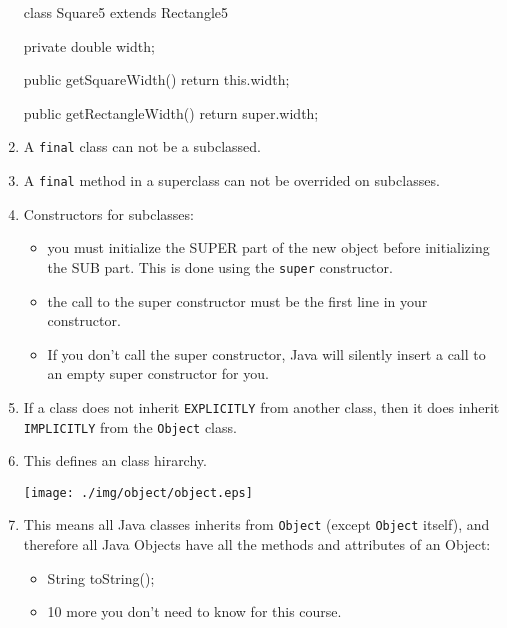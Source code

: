 \documentclass[a4paper, 9pt]{extarticle}
\begin{document}
\begin{enumerate}
\begin{blackboard}
class Square5 extends Rectangle5 {
  private double width;

  public getSquareWidth() {
    return this.width;
  }

  public getRectangleWidth() {
    return super.width;
  }
}
\end{blackboard}

  \item A \verb+final+ class can not be a subclassed.

  \item A \verb+final+ method in a superclass can not be overrided on
    subclasses.

  \item Constructors for subclasses:

    \begin{itemize}

      \item you must initialize the SUPER part of the new object before
        initializing the SUB part. This is done using the \verb+super+
        constructor.

      \item the call to the super constructor must be the first line in your
        constructor.

      \item If you don't call the super constructor, Java will silently insert
        a call to an empty super constructor for you.

    \end{itemize}

  \item If a class does not inherit \verb+EXPLICITLY+ from another class, then
    it does inherit \verb+IMPLICITLY+ from the \verb+Object+ class.

  \item This defines an class hirarchy.

    \begin{center}
      \texttt{[image: ./img/object/object.eps]}
    \end{center}

  \item This means all Java classes inherits from \verb+Object+ (except
    \verb+Object+ itself), and therefore all Java Objects have all the methods and
    attributes of an Object:

      \begin{itemize}

        \item String toString();

        \item 10 more you don't need to know for this course.

      \end{itemize}

\end{enumerate}
\end{document}
